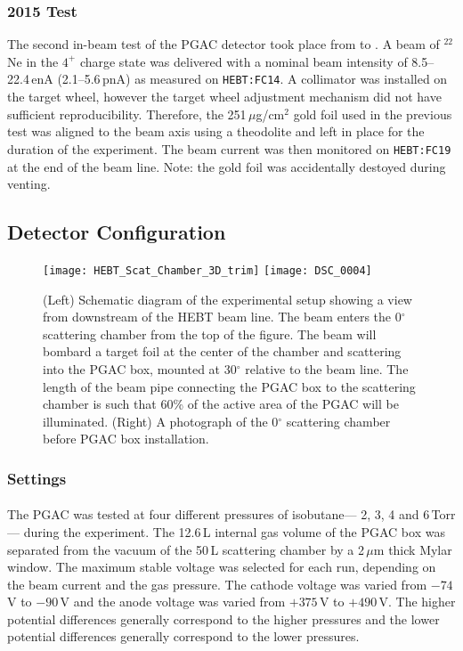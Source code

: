 \subsubsection{2015 Test}
The second in-beam test of the PGAC detector took place from \longusdate{} to \longusdate{}. A beam of $^{22}$Ne in the $4^+$ charge state was delivered with a nominal beam intensity of 8.5--22.4\,enA (2.1--5.6\,pnA) as measured on \texttt{HEBT:FC14}. A collimator was installed on the target wheel, however the target wheel adjustment mechanism did not have sufficient reproducibility. Therefore,  the 251\,$\mu$g/cm$^2$ gold foil used in the previous test was aligned to the beam axis using a theodolite and left in place for the duration of the experiment. The beam current was then monitored on \texttt{HEBT:FC19} at the end of the beam line. Note: the gold foil was accidentally destoyed during venting.


\subsection{Detector Configuration}
\begin{figure}
\centering
\hspace{\fill}
\texttt{[image: HEBT\_Scat\_Chamber\_3D\_trim]}\hspace{\fill}
\texttt{[image: DSC\_0004]} \hspace{\fill}
\caption{(Left) Schematic diagram of the experimental setup showing a view from downstream of the HEBT beam line.  The beam enters the 0$^\circ$ scattering chamber from the top of the figure.  The beam will bombard a target foil at the center of the chamber and scattering into the PGAC box, mounted at 30$^\circ$ relative to the beam line.  The length of the beam pipe connecting the PGAC box to the scattering chamber is such that 60\% of the active area of the PGAC will be illuminated.  (Right) A photograph of the 0$^\circ$ scattering chamber before PGAC box installation.}
\label{schematic}
\end{figure}
\subsubsection{Settings}
\paragraph{ }The PGAC was tested at four different pressures of %
 isobutane---%
 2, 3, 4 and 6\,Torr---%
 during the experiment. The 12.6\,L internal gas volume of the PGAC box was separated from the vacuum of the 50\,L scattering chamber by a 2\,$\mu$m thick Mylar window. The maximum stable voltage was selected for each run, depending on the beam current and the gas pressure. The cathode voltage was varied from $-74$\,V to $-90$\,V and the anode voltage was varied from $+375$\,V to $+490$\,V.  The higher potential differences generally correspond to the higher pressures and the lower potential differences generally correspond to the lower pressures.
